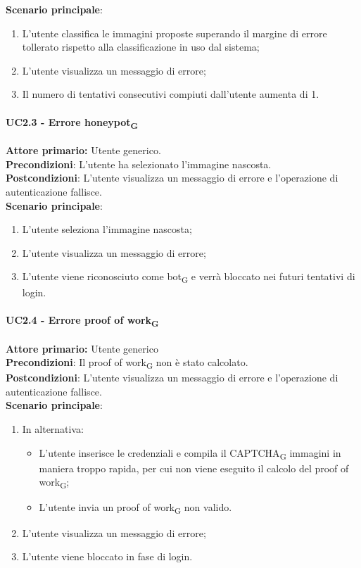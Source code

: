 \textbf{Scenario principale}:
\begin{enumerate}
    \item L'utente classifica le immagini proposte superando il margine di errore tollerato rispetto alla classificazione in uso dal sistema;
	\item L’utente visualizza un messaggio di errore;
	\item Il numero di tentativi consecutivi compiuti dall’utente aumenta di 1.
\end{enumerate}

\paragraph{UC2.3 - Errore honeypot\textsubscript{G}}
\textbf{Attore primario:} Utente generico.\\
\textbf{Precondizioni}: L’utente ha selezionato l'immagine nascosta.\\
\textbf{Postcondizioni}: L’utente visualizza un messaggio di errore e l’operazione di autenticazione fallisce.\\

\textbf{Scenario principale}:
\begin{enumerate}
    \item L'utente seleziona l'immagine nascosta;
	\item L’utente visualizza un messaggio di errore;
	\item L'utente viene riconosciuto come bot\textsubscript{G} e verrà bloccato nei futuri tentativi di login.
\end{enumerate}

\paragraph{UC2.4 - Errore proof of work\textsubscript{G}}
\textbf{Attore primario:} Utente generico\\
\textbf{Precondizioni}: Il proof of work\textsubscript{G} non è stato calcolato.\\
\textbf{Postcondizioni}:  L’utente visualizza un messaggio di errore e l’operazione di autenticazione fallisce.\\

\textbf{Scenario principale}:
\begin{enumerate}
    \item In alternativa:
    \begin{itemize}
        \item L'utente inserisce le credenziali e compila il CAPTCHA\textsubscript{G} immagini in maniera troppo rapida, per cui non viene eseguito il calcolo del proof of work\textsubscript{G};
        \item L'utente invia un proof of work\textsubscript{G} non valido.
    \end{itemize}
	\item L’utente visualizza un messaggio di errore;
	\item L'utente viene bloccato in fase di login.
\end{enumerate}

